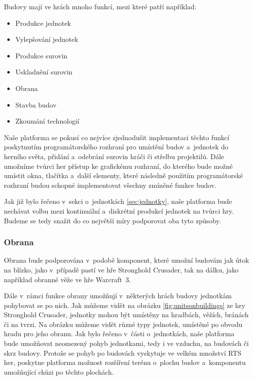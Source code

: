 Budovy mají ve hrách mnoho funkcí, mezi které patří například:
\begin{itemize}
	\item Produkce jednotek
	\item Vylepšování jednotek
	\item Produkce surovin
	\item Uskladnění surovin
	\item Obrana
	\item Stavba budov
	\item Zkoumání technologií
\end{itemize}


Naše platforma se pokusí co nejvíce zjednodušit implementaci těchto funkcí poskytnutím programátorského rozhraní pro umístění budov a~jednotek do herního světa, přidání a~odebrání surovin hráči či střelbu projektilů. Dále umožníme tvůrci her přístup ke grafickému rozhraní, do kterého bude možné umístit okna, tlačítka a~další elementy, které následně použitím programátorské rozhraní budou schopné implementovat všechny zmíněné funkce budov.  

Jak již bylo řečeno v~sekci o~jednotkách \ref{sec:jednotky}, naše platforma bude nechávat volbu mezi kontinuální a~diskrétní produkcí jednotek na tvůrci hry. Budeme se tedy snažit do co největší míry podporovat oba tyto způsoby. 

\subsubsection{Obrana}

Obrana bude podporována v~podobě komponent, které umožní budovám jak útok na blízko, jako v~případě pastí ve hře Stronghold Crusader\citep{site:strongholdcrus}, tak na dálku, jako například obranné věže ve hře Warcraft~3\citep{site:warcraft3}. 

Dále v~rámci funkce obrany umožňují v~některých hrách budovy jednotkám pohybovat se po nich. Jak můžeme vidět na obrázku \ref{fig:unitsonbuildings} ze hry Stronghold Crusader\citep{site:strongholdcrus}, jednotky mohou být umístěny na hradbách, věžích, bránách či na tvrzi. Na obrázku můžeme vidět různé typy jednotek, umístěné po obvodu hradu pro jeho obranu. Jak bylo řečeno v~části o~jednotkách, naše platforma bude umožňovat neomezený pohyb jednotkami, tedy i ve vzduchu, na budovách či skrz budovy. Protože se pohyb po budovách vyskytuje ve velkém množství RTS her, poskytne platforma možnost rozšíření terénu o~plochu budov a~komponentu umožňující chůzi po těchto plochách.

